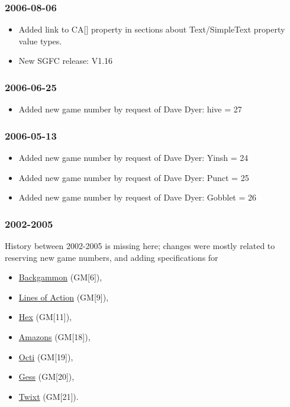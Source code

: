 \subsubsection{2006-08-06}\label{section-2}

\begin{itemize}
\item
  Added link to CA{[}{]} property in sections about Text/SimpleText
  property value types.
\item
  New SGFC release: V1.16
\end{itemize}

\subsubsection{2006-06-25}\label{section-3}

\begin{itemize}
\tightlist
\item
  Added new game number by request of Dave Dyer: hive = 27
\end{itemize}

\subsubsection{2006-05-13}\label{section-4}

\begin{itemize}
\item
  Added new game number by request of Dave Dyer: Yinsh = 24
\item
  Added new game number by request of Dave Dyer: Punct = 25
\item
  Added new game number by request of Dave Dyer: Gobblet = 26
\end{itemize}

\subsubsection{2002-2005}\label{section-5}

History between 2002-2005 is missing here; changes were mostly related
to reserving new game numbers, and adding specifications for

\begin{itemize}
\item
  \href{https://red-bean.com/sgf/backgammon.html}{Backgammon}
  (GM{[}6{]}),
\item
  \href{https://red-bean.com/sgf/loa.html}{Lines of Action} (GM{[}9{]}),
\item
  \href{https://red-bean.com/sgf/hex.html}{Hex} (GM{[}11{]}),
\item
  \href{https://red-bean.com/sgf/amazons.html}{Amazons} (GM{[}18{]}),
\item
  \href{https://red-bean.com/sgf/octi.html}{Octi} (GM{[}19{]}),
\item
  \href{https://red-bean.com/sgf/gess.html}{Gess} (GM{[}20{]}),
\item
  \href{https://red-bean.com/sgf/twixt.html}{Twixt} (GM{[}21{]}).
\end{itemize}

